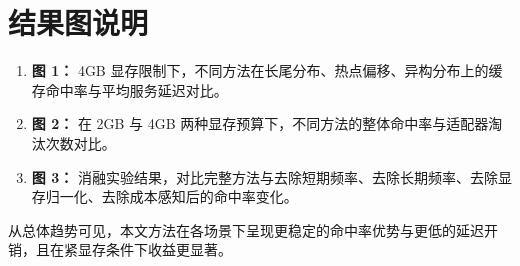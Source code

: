 \section{结果图说明}
\begin{enumerate}
  \item \textbf{图 1：} 4GB 显存限制下，不同方法在长尾分布、热点偏移、异构分布上的缓存命中率与平均服务延迟对比。
  \item \textbf{图 2：} 在 2GB 与 4GB 两种显存预算下，不同方法的整体命中率与适配器淘汰次数对比。
  \item \textbf{图 3：} 消融实验结果，对比完整方法与去除短期频率、去除长期频率、去除显存归一化、去除成本感知后的命中率变化。
\end{enumerate}

从总体趋势可见，本文方法在各场景下呈现更稳定的命中率优势与更低的延迟开销，且在紧显存条件下收益更显著。
